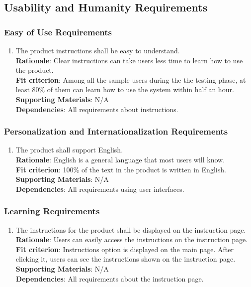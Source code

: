 \documentclass{article}
\begin{document}
\subsection{Usability and Humanity Requirements}
\subsubsection{Easy of Use Requirements}
\begin{enumerate}[UH1.1]
    \item The product instructions shall be easy to understand.\\
    \textbf{Rationale}: Clear instructions can take users less time to learn how to use the product.\\
    \textbf{Fit criterion}: Among all the sample users during the 
    the testing phase, at least 80\% of them can learn how to use the system within half an hour.\\
\textbf{Supporting Materials}: N/A\\
\textbf{Dependencies}: All requirements about instructions.\\

\end{enumerate}
\subsubsection{Personalization and Internationalization Requirements}
\begin{enumerate}[UH2.1]
    \item The product shall support English.\\
    \textbf{Rationale}: English is a general language that most users will know.\\
    \textbf{Fit criterion}: 100\% of the text in the product is written in English.\\
\textbf{Supporting Materials}: N/A\\
\textbf{Dependencies}: All requirements using user interfaces.\\

\end{enumerate}
\subsubsection{Learning Requirements}
\begin{enumerate}[UH3.1]
    \item The instructions for the product shall be displayed on the instruction page.\\
    \textbf{Rationale}: Users can easily access the instructions on the instruction page.\\
    \textbf{Fit criterion}: Instructions option is displayed on the main page. After clicking it, users can see the instructions shown on the instruction page.\\
\textbf{Supporting Materials}: N/A\\
\textbf{Dependencies}: All requirements about the instruction page.\\

\end{enumerate}
\end{document}
